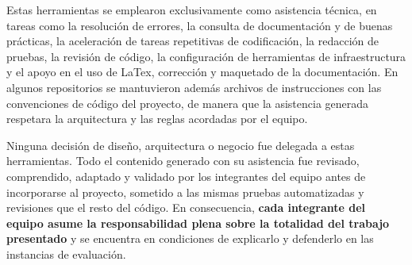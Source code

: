 Estas herramientas se emplearon exclusivamente como asistencia técnica, en tareas como la resolución de errores, la consulta de documentación y de buenas prácticas, la aceleración de tareas repetitivas de codificación, la redacción de pruebas, la revisión de código, la configuración de herramientas de infraestructura y el apoyo en el uso de LaTex, corrección y maquetado de la documentación. En algunos repositorios se mantuvieron además archivos de instrucciones con las convenciones de código del proyecto, de manera que la asistencia generada respetara la arquitectura y las reglas acordadas por el equipo.

Ninguna decisión de diseño, arquitectura o negocio fue delegada a estas herramientas. Todo el contenido generado con su asistencia fue revisado, comprendido, adaptado y validado por los integrantes del equipo antes de incorporarse al proyecto, sometido a las mismas pruebas automatizadas y revisiones que el resto del código. En consecuencia, \textbf{cada integrante del equipo asume la responsabilidad plena sobre la totalidad del trabajo presentado} y se encuentra en condiciones de explicarlo y defenderlo en las instancias de evaluación.
